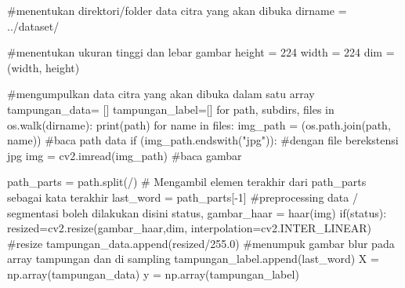 \documentclass[
  letterpaper,
  DIV=11,
  numbers=noendperiod]{scrreprt}
\newenvironment{Shaded}{\begin{snugshade}}{\end{snugshade}}
\newcommand{\BuiltInTok}[1]{\textcolor[rgb]{0.00,0.23,0.31}{#1}}
\newcommand{\CommentTok}[1]{\textcolor[rgb]{0.37,0.37,0.37}{#1}}
\newcommand{\ControlFlowTok}[1]{\textcolor[rgb]{0.00,0.23,0.31}{#1}}
\newcommand{\DecValTok}[1]{\textcolor[rgb]{0.68,0.00,0.00}{#1}}
\newcommand{\FloatTok}[1]{\textcolor[rgb]{0.68,0.00,0.00}{#1}}
\newcommand{\KeywordTok}[1]{\textcolor[rgb]{0.00,0.23,0.31}{#1}}
\newcommand{\NormalTok}[1]{\textcolor[rgb]{0.00,0.23,0.31}{#1}}
\newcommand{\OperatorTok}[1]{\textcolor[rgb]{0.37,0.37,0.37}{#1}}
\newcommand{\StringTok}[1]{\textcolor[rgb]{0.13,0.47,0.30}{#1}}
\begin{document}
\begin{Shaded}
\begin{Highlighting}[]
\CommentTok{\#menentukan direktori/folder data citra yang akan dibuka}
\NormalTok{dirname }\OperatorTok{=} \StringTok{\textquotesingle{}../dataset/\textquotesingle{}}  

\CommentTok{\#menentukan ukuran tinggi dan lebar gambar}
\NormalTok{height }\OperatorTok{=} \DecValTok{224}
\NormalTok{width }\OperatorTok{=} \DecValTok{224}
\NormalTok{dim }\OperatorTok{=}\NormalTok{ (width, height)}

\CommentTok{\#mengumpulkan data citra yang akan dibuka dalam satu array}
\NormalTok{tampungan\_data}\OperatorTok{=}\NormalTok{ [] }
\NormalTok{tampungan\_label}\OperatorTok{=}\NormalTok{[]}
\ControlFlowTok{for}\NormalTok{ path, subdirs, files }\KeywordTok{in}\NormalTok{ os.walk(dirname):}
    \BuiltInTok{print}\NormalTok{(path)}
    \ControlFlowTok{for}\NormalTok{ name }\KeywordTok{in}\NormalTok{ files:}
\NormalTok{        img\_path }\OperatorTok{=}\NormalTok{ (os.path.join(path, name))  }\CommentTok{\#baca path data}
        \ControlFlowTok{if}\NormalTok{ (img\_path.endswith(}\StringTok{"jpg"}\NormalTok{)): }\CommentTok{\#dengan file berekstensi jpg}
\NormalTok{            img }\OperatorTok{=}\NormalTok{ cv2.imread(img\_path) }\CommentTok{\#baca gambar}
            
\NormalTok{            path\_parts }\OperatorTok{=}\NormalTok{ path.split(}\StringTok{\textquotesingle{}/\textquotesingle{}}\NormalTok{)}
            \CommentTok{\# Mengambil elemen terakhir dari path\_parts sebagai kata terakhir}
\NormalTok{            last\_word }\OperatorTok{=}\NormalTok{ path\_parts[}\OperatorTok{{-}}\DecValTok{1}\NormalTok{]}
            \CommentTok{\#preprocessing data / segmentasi  boleh dilakukan disini}
\NormalTok{            status, gambar\_haar }\OperatorTok{=}\NormalTok{ haar(img)}
            \ControlFlowTok{if}\NormalTok{(status):}
\NormalTok{                resized}\OperatorTok{=}\NormalTok{cv2.resize(gambar\_haar,dim, interpolation}\OperatorTok{=}\NormalTok{cv2.INTER\_LINEAR) }\CommentTok{\#resize}
\NormalTok{                tampungan\_data.append(resized}\OperatorTok{/}\FloatTok{255.0}\NormalTok{) }\CommentTok{\#menumpuk gambar blur pada array tampungan dan di sampling}
\NormalTok{                tampungan\_label.append(last\_word)}
\NormalTok{    X }\OperatorTok{=}\NormalTok{ np.array(tampungan\_data) }
\NormalTok{    y }\OperatorTok{=}\NormalTok{ np.array(tampungan\_label)}
\end{Highlighting}
\end{Shaded}
\end{document}
